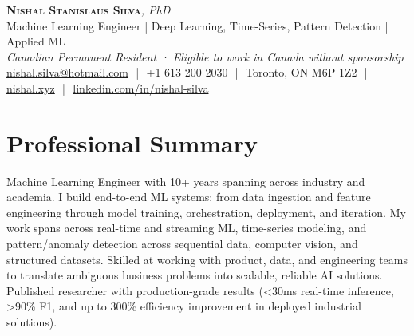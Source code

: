 \documentclass[11pt]{article}
\begin{document}
\pagestyle{empty}

\begin{center}
    {\LARGE \scshape \textbf{Nishal Stanislaus Silva}}{\large \textit {, PhD}}
    \\[1pt]
    {\small Machine Learning Engineer | Deep Learning, Time-Series, Pattern Detection | Applied ML}
    \\[1pt]
    {\footnotesize\textit{Canadian Permanent Resident · Eligible to work in Canada without sponsorship}}
    \\[1pt]
    {\small
    \href{mailto:nishal.silva@hotmail.com}{nishal.silva@hotmail.com}
    \,\,|\,\, +1 613 200 2030
    \,\,|\,\, Toronto, ON M6P 1Z2 
    \,\,|\,\, \href{https://nishal.xyz}{nishal.xyz}
    \,\,|\,\, \href{https://www.linkedin.com/in/nishal-silva}{linkedin.com/in/nishal-silva}}
\end{center}

\section*{Professional Summary}


Machine Learning Engineer with 10+ years spanning across industry and academia. I build end-to-end ML systems: from data ingestion and feature engineering through model training, orchestration, deployment, and iteration. My work spans across real-time and streaming ML, time-series modeling, and pattern/anomaly detection across sequential data, computer vision, and structured datasets. Skilled at working with product, data, and engineering teams to translate ambiguous business problems into scalable, reliable AI solutions. Published researcher with production-grade results (<30ms real-time inference, >90\% F1, and up to 300\% efficiency improvement in deployed industrial solutions).
\end{document}
